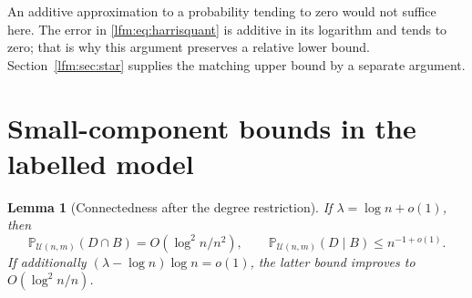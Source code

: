 \documentclass[11pt,letterpaper]{article}
\newtheorem{lemma}[theorem]{Lemma}
\theoremstyle{remark}\newtheorem{remark}[theorem]{Remark}
\newcommand{\Prob}{\mathbb P}\newcommand{\E}{\mathbb E}
\newcommand{\U}{\mathcal U}\newcommand{\dd}{\,\mathrm d}
\begin{document}
An additive approximation to a probability tending to zero would not suffice here. The error in \eqref{lfm:eq:harrisquant} is additive in its logarithm and tends to zero; that is why this argument preserves a relative lower bound. Section~\ref{lfm:sec:star} supplies the matching upper bound by a separate argument.

\section{Small-component bounds in the labelled model}\label{lfm:sec:cuts}
\begin{lemma}[Connectedness after the degree restriction]\label{lfm:lem:cuts}
If $\lambda=\log n+o(1)$, then
\begin{equation}
 \Prob_{\U(n,m)}(D\cap B)=O(\log^2n/n^2),\qquad
 \Prob_{\U(n,m)}(D\mid B)\le n^{-1+o(1)}.\label{lfm:eq:cuts}
\end{equation}
If additionally $(\lambda-\log n)\log n=o(1)$, the latter bound improves to $O(\log^2n/n)$.
\end{lemma}
\end{document}
